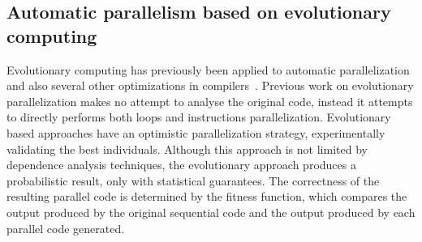 \documentclass[a4paper,12pt]{article}
\newcommand{\etal}{et~al.}
\begin{document}
%

\subsection{Automatic parallelism based on evolutionary computing}

Evolutionary computing has previously been applied to automatic parallelization
and also several other optimizations in compilers~\cite{walsh95,walsh96,williams96,williams99,schulte14a}.
Previous work on evolutionary parallelization makes
no attempt to analyse the original code, instead it attempts to directly
performs both loops and instructions parallelization.
Evolutionary based approaches have an optimistic parallelization strategy,
experimentally validating the best individuals. Although this approach is not
limited by dependence analysis techniques, the evolutionary approach produces a
probabilistic result, only with statistical guarantees.
The correctness of the
resulting parallel code is determined by the fitness function, which compares
the output produced by the original sequential code and the output produced by
each parallel code generated.
\end{document}

